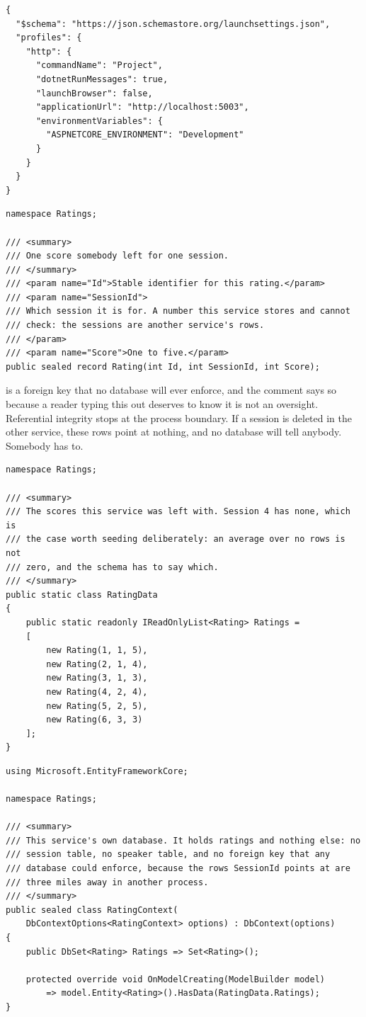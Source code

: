 \begin{verbatim}
{
  "$schema": "https://json.schemastore.org/launchsettings.json",
  "profiles": {
    "http": {
      "commandName": "Project",
      "dotnetRunMessages": true,
      "launchBrowser": false,
      "applicationUrl": "http://localhost:5003",
      "environmentVariables": {
        "ASPNETCORE_ENVIRONMENT": "Development"
      }
    }
  }
}
\end{verbatim}

\begin{verbatim}
namespace Ratings;

/// <summary>
/// One score somebody left for one session.
/// </summary>
/// <param name="Id">Stable identifier for this rating.</param>
/// <param name="SessionId">
/// Which session it is for. A number this service stores and cannot
/// check: the sessions are another service's rows.
/// </param>
/// <param name="Score">One to five.</param>
public sealed record Rating(int Id, int SessionId, int Score);
\end{verbatim}

%
 is a foreign key that no database will ever enforce, and the
comment says so because a reader typing this out deserves to know it is not an
oversight. Referential integrity stops at the process boundary. If a session is
deleted in the other service, these rows point at nothing, and no database
will tell anybody. Somebody has to.

\begin{verbatim}
namespace Ratings;

/// <summary>
/// The scores this service was left with. Session 4 has none, which is
/// the case worth seeding deliberately: an average over no rows is not
/// zero, and the schema has to say which.
/// </summary>
public static class RatingData
{
    public static readonly IReadOnlyList<Rating> Ratings =
    [
        new Rating(1, 1, 5),
        new Rating(2, 1, 4),
        new Rating(3, 1, 3),
        new Rating(4, 2, 4),
        new Rating(5, 2, 5),
        new Rating(6, 3, 3)
    ];
}
\end{verbatim}

\begin{verbatim}
using Microsoft.EntityFrameworkCore;

namespace Ratings;

/// <summary>
/// This service's own database. It holds ratings and nothing else: no
/// session table, no speaker table, and no foreign key that any
/// database could enforce, because the rows SessionId points at are
/// three miles away in another process.
/// </summary>
public sealed class RatingContext(
    DbContextOptions<RatingContext> options) : DbContext(options)
{
    public DbSet<Rating> Ratings => Set<Rating>();

    protected override void OnModelCreating(ModelBuilder model)
        => model.Entity<Rating>().HasData(RatingData.Ratings);
}
\end{verbatim}

